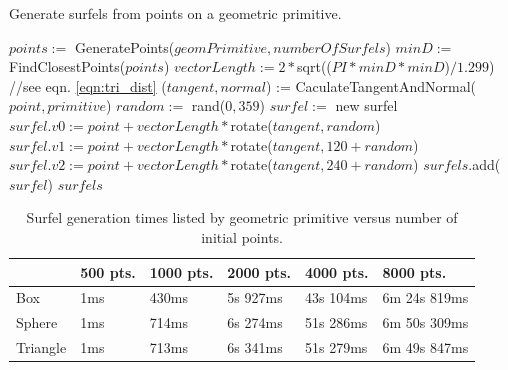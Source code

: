 \begin{algorithm}[H]
\captionfont
\caption[Surfel generation]{Generate surfels from points on a geometric primitive.}
\label{alg:surfel_gen}
\begin{algorithmic}
      \State $points :=$ GeneratePoints($geomPrimitive, numberOfSurfels$)
      \State $minD :=$ FindClosestPoints($points$)
      \State $vectorLength := 2 * $sqrt(($PI * minD * minD$)$ / 1.299$) //see eqn. \ref{eqn:tri_dist}
         \State ($tangent, normal$) := CaculateTangentAndNormal($point, primitive$)
         \State $random :=$ rand($0, 359$)
         \State $surfel :=$ new surfel
         \State $surfel.v0 := point + vectorLength * $rotate($tangent, random$)
         \State $surfel.v1 := point + vectorLength * $rotate($tangent, 120+random$)
         \State $surfel.v2 := point + vectorLength * $rotate($tangent, 240+random$)
         \State $surfels$.add($surfel$)
      \EndFor
      \State \Return $surfels$
   \EndFunction
\end{algorithmic}
\end{algorithm}

\vfill
\begin{table}[h!]
   \centering
   \begin{tabular}{ | l | l | l | l | l | l | }
   \hline
   & 500 pts. & 1000 pts. & 2000 pts. & 4000 pts. & 8000 pts. \\ \hline
   Box & 1ms & 430ms & 5s 927ms & 43s 104ms & 6m 24s 819ms \\ \hline
   Sphere & 1ms & 714ms & 6s 274ms & 51s 286ms & 6m 50s 309ms \\ \hline
   Triangle & 1ms & 713ms & 6s 341ms & 51s 279ms & 6m 49s 847ms \\ \hline
   \end{tabular}
   \captionfonts
   \caption[Surfel generation times]{Surfel generation times listed by geometric primitive versus number of initial points.}
   \label{tbl:surf_gen_times}
\end{table}
\vfill
                        
